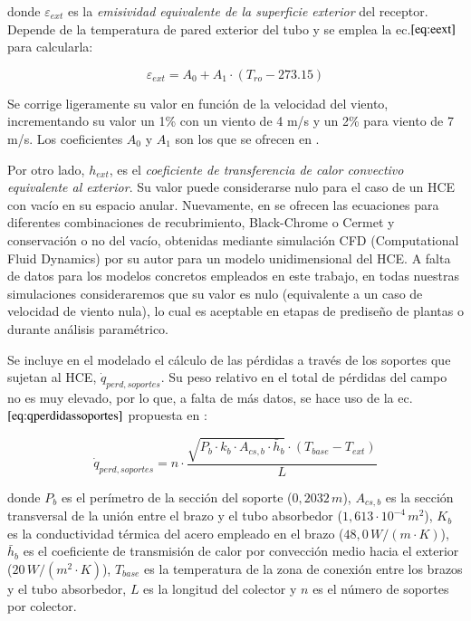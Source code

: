 donde   \(\varepsilon_{ext}\) es la \textit{emisividad equivalente de la superficie  exterior} del receptor. Depende de la temperatura de pared exterior del tubo y se emplea la ec.\(\eqref{eq:eext}\) para calcularla:

\begin{equation}
   \varepsilon_{ext} =  A_0 + A_1 \cdot  (T_{ro} - 273.15)
    \label{eq:eext}
\end{equation}

Se corrige ligeramente su valor en función de la velocidad del viento, incrementando su valor un 1\% con un viento de 4 m/s y un 2\% para viento de 7 m/s. Los coeficientes \(A_0\) y \(A_1\) son los que se ofrecen en \cite{barberofresnoDesarrolloModeloTeorico2018}.

Por otro lado,  \(h_{ext}\), es el \textit{coeficiente de transferencia de calor convectivo  equivalente al exterior}. Su valor puede considerarse nulo para el caso  de un HCE con vacío en su espacio anular. Nuevamente, en \cite{barberofresnoDesarrolloModeloTeorico2018} se ofrecen las ecuaciones para diferentes combinaciones de   recubrimiento, Black-Chrome o Cermet y conservación o no del vacío,   obtenidas mediante simulación CFD (Computational Fluid Dynamics) por su autor para un modelo unidimensional del HCE. A falta de datos para los modelos concretos empleados en este trabajo, en todas nuestras simulaciones consideraremos que su valor es nulo (equivalente a un caso de velocidad de viento nula), lo cual es aceptable en etapas de prediseño de plantas o durante análisis paramétrico.

Se incluye en el modelado el cálculo de las pérdidas a través de los soportes que sujetan al HCE, \(\dot q_{perd,soportes}\). Su peso relativo en el total de pérdidas del campo no es muy elevado, por lo que, a falta de más datos, se hace uso de la ec.\(\eqref{eq:qperdidassoportes}\)  propuesta en \cite{forristallHeatTransferAnalysis2003}:

\begin{equation}
   \dot q_{perd,soportes} =  n \cdot \frac{\sqrt{P_b \cdot k_b \cdot A_{cs,b} \cdot \bar h_b} \cdot (T_{base} - T_{ext})}{L}
    \label{eq:qperdidassoportes}
\end{equation}

donde \(P_b\) es el perímetro de la sección del soporte ($0,2032\,m$), \(A_{cs,b}\) es la sección transversal de la unión entre el brazo y el tubo absorbedor ($1,613\cdot 10^{-4}\,  m^2$), \(K_b\) es la conductividad térmica del acero empleado en el brazo ($48,0\,W/(m \cdot K)$), \(\bar h_b\) es el coeficiente de transmisión de calor por convección medio hacia el exterior ($20\, W/(m^2 \cdot K)$), \(T_{base}\) es la temperatura de la zona de conexión entre los brazos y el tubo absorbedor, \(L\) es la longitud del colector y \(n\) es el número de soportes por colector.

